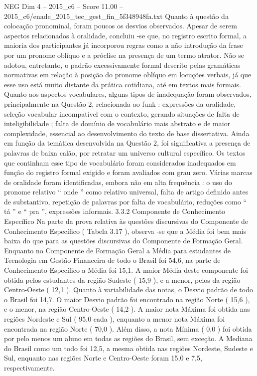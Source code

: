 \begin{textsample}{NEG Dim 4 – 2015\_c6 – Score 11.00 – 2015\_c6/enade\_2015\_tec\_gest\_fin\_5f348948fa.txt}
Quanto à questão da colocação pronominal, foram poucos os desvios observados.
Apesar de serem aspectos relacionados à oralidade, concluiu -se que, no registro escrito formal, a maioria dos participantes já incorporou regras como a não introdução da frase por um pronome oblíquo e a próclise na presença de um termo atrator.
Não se adotou, entretanto, o padrão excessivamente formal descrito pelas gramáticas normativas em relação à posição do pronome oblíquo em locuções verbais, já que esse uso está muito distante da prática cotidiana, até em textos mais formais.
Quanto aos aspectos vocabulares, alguns tipos de inadequação foram observados, principalmente na Questão 2, relacionada ao funk : expressões da oralidade, seleção vocabular incompatível com o contexto, gerando situações de falta de inteligibilidade ; falta de domínio de vocabulário mais abstrato e de maior complexidade, essencial ao desenvolvimento do texto de base dissertativa.
Ainda em função da temática desenvolvida na Questão 2, foi significativa a presença de palavras de baixa calão, por retratar um universo cultural específico.
Os textos que continham esse tipo de vocabulário foram considerados inadequados em função do registro formal exigido e foram avaliados com grau zero.
Várias marcas de oralidade foram identificadas, embora não em alta frequência : o uso do pronome relativo “ onde ” como relativo universal, falta de artigo definido antes de substantivo, repetição de palavras por falta de vocabulário, reduções como “ tá ” e “ pra ”, expressões informais. 3.3.2 Componente de Conhecimento Específico Na parte da prova relativa às questões discursivas do Componente de Conhecimento Específico ( Tabela 3.17 ), observa -se que a Média foi bem mais baixa do que para as questões discursivas do Componente de Formação Geral.
Enquanto no Componente de Formação Geral a Média para estudantes de Tecnologia em Gestão Financeira de todo o Brasil foi 54,6, na parte de Conhecimento Específico a Média foi 15,1.
A maior Média deste componente foi obtida pelos estudantes da região Sudeste ( 15,9 ), e a menor, pelos da região Centro-Oeste ( 12,1 ).
Quanto à variabilidade das notas, o Desvio padrão de todo o Brasil foi 14,7.
O maior Desvio padrão foi encontrado na região Norte ( 15,6 ), e o menor, na região Centro-Oeste ( 14,2 ).
A maior nota Máxima foi obtida nas regiões Nordeste e Sul ( 95,0 cada ), enquanto a menor nota Máxima foi encontrada na região Norte ( 70,0 ).
Além disso, a nota Mínima ( 0,0 ) foi obtida por pelo menos um aluno em todas as regiões do Brasil, sem exceção.
A Mediana do Brasil como um todo foi 12,5, a mesma obtida nas regiões Nordeste, Sudeste e Sul, enquanto nas regiões Norte e Centro-Oeste foram 15,0 e 7,5, respectivamente.

\end{textsample}
